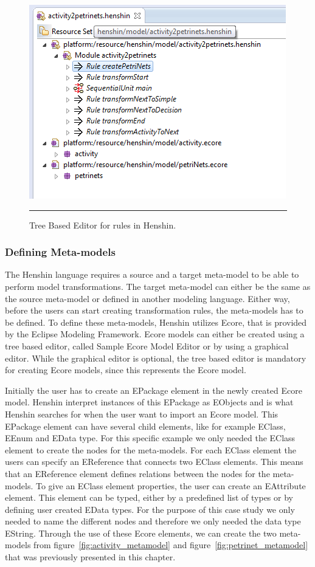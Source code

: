 \begin{figure}[H]
	\centering
	\includegraphics[scale=0.7]{figures/Henshin_TreeEdtiro.png}
	\rule{35em}{0.5pt}
	\caption[The Henshin Model Editor]
	{Tree Based Editor for rules in Henshin.}
	\label{fig:Henshin_TreeEditor}
\end{figure}

\subsubsection*{Defining Meta-models}

The Henshin language requires a source and a target meta-model to be able to
perform model transformations. The target meta-model can either be the same as
the source meta-model or defined in another modeling language. Either way, before
the users can start creating transformation rules, the meta-models has
to be defined. To define these meta-models, Henshin utilizes Ecore, that is
provided by the Eclipse Modeling Framework\cite{Steinberg2009}. Ecore models
can either be created using a tree based editor, called Sample Ecore Model
Editor or by using a graphical editor. While the graphical editor is optional,
the tree based editor is mandatory for creating Ecore models, since this
represents the Ecore model.

Initially the user has to create an EPackage element in the newly created Ecore
model. Henshin interpret instances of this EPackage as EObjects and is what
Henshin searches for when the user want to import an Ecore model. This EPackage
element can have several child elements, like for example EClass, EEnum and
EData type. For this specific example we only needed the EClass element to
create the nodes for the meta-models. For each EClass element the users can
specify an EReference that connects two EClass elements. This means that an
EReference element defines relations between the nodes for the meta-models. To
give an EClass element properties, the user can create an EAttribute element.
This element can be typed, either by a predefined list of types or by defining
user created EData types. For the purpose of this case study we only needed to
name the different nodes and therefore we only needed the data type EString.
Through the use of these Ecore elements, we can create the two meta-models from
figure~\ref{fig:activity_metamodel} and figure~\ref{fig:petrinet_metamodel} that
was previously presented in this chapter. 


